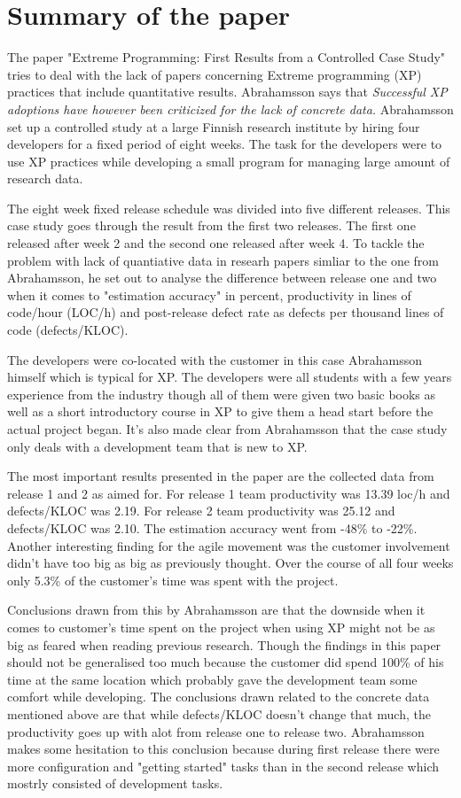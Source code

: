 \newpage
\section{Summary of the paper}
The paper "Extreme Programming: First Results from a Controlled Case Study"
\cite{abrahamsson2003} tries to deal with the lack of papers concerning Extreme
programming (XP) practices that include quantitative results. Abrahamsson says that
{\em Successful XP adoptions have however been criticized for the lack of
concrete data.} Abrahamsson set up a controlled study at a large Finnish
research institute by hiring four developers for a fixed period of eight weeks.
The task for the developers were to use XP practices while developing a small
program for managing large amount of research data.

The eight week fixed release schedule was divided into five different releases.
This case study goes through the result from the first two releases. The first
one released after week 2 and the second one released after week 4. To tackle
the problem with lack of quantiative data in researh papers simliar to the one
from Abrahamsson, he set out to analyse the difference between release one and
two when it comes to "estimation accuracy" in percent, productivity in lines of
code/hour (LOC/h) and post-release defect rate as defects per thousand lines of
code (defects/KLOC).

The developers were co-located with the customer in this case Abrahamsson
himself which is typical for XP. The developers were all students with a few
years experience from the industry though all of them were given two basic
books as well as a short introductory course in XP to give them a head start
before the actual project began. It's also made clear from Abrahamsson that
the case study only deals with a development team that is new to XP.

The most important results presented in the paper are the collected data from
release 1 and 2 as aimed for. For release 1 team productivity was 13.39
loc/h and defects/KLOC was 2.19. For release 2 team productivity was 25.12 and
defects/KLOC was 2.10. The estimation accuracy went from -48\% to
-22\%. Another interesting finding for the agile movement was the customer
involvement didn't have too big as big as previously thought. Over the course
of all four weeks only 5.3\% of the customer's time was spent with the project.

Conclusions drawn from this by Abrahamsson are that the downside when it comes
to customer's time spent on the project when using XP might not be as big as
feared when reading previous research. Though the findings in this paper should
not be generalised too much because the customer did spend 100\% of his time at
the same location which probably gave the development team some comfort while
developing. The conclusions drawn related to the concrete data mentioned above
are that while defects/KLOC doesn't change that much, the productivity goes up
with alot from release one to release two. Abrahamsson makes some hesitation
to this conclusion because during first release there were more
configuration and "getting started" tasks than in the second release which
mostrly consisted of development tasks.
